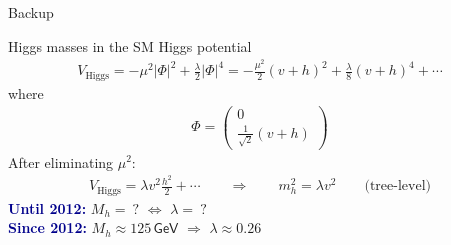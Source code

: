 \documentclass[hyperref={pdfpagelabels=false},ngerman]{beamer}
\newcommand{\eh}[1]{\,\mathsf{#1}}
\renewcommand{\emph}[1]{\textbf{\textcolor{darkblue}{#1}}}
\begin{document}

\begin{frame}[noframenumbering]
  \begin{center}
    \Huge Backup
  \end{center}
\end{frame}


\begin{frame}[noframenumbering]{Higgs masses in the SM}
  Higgs potential
  \begin{align*}
    V_{\text{Higgs}} = -\mu^2 |\Phi|^2 + \frac{\lambda}{2}|\Phi|^4
    = -\frac{\mu^2}{2} (v+h)^2 + \frac{\lambda}{8} (v+h)^4 + \cdots
  \end{align*}
  where
  \begin{align*}
    \Phi =
    \begin{pmatrix}
      0 \\ \frac{1}{\sqrt{2}} (v + h)
    \end{pmatrix}
  \end{align*}
  After eliminating $\mu^2$:
  \begin{align*}
    V_{\text{Higgs}} = \lambda v^2 \frac{h^2}{2} + \cdots
    \qquad\Rightarrow\qquad
    m_h^2 = \lambda v^2  \qquad \text{(tree-level)}
  \end{align*}
  \emph{Until 2012:} $M_h =\ ?$ $\Leftrightarrow$ $\lambda =\ ?$\\
  \emph{Since 2012:} $M_h \approx 125\eh{GeV}$ $\Rightarrow$ $\lambda \approx 0.26$
\end{frame}

\end{document}
